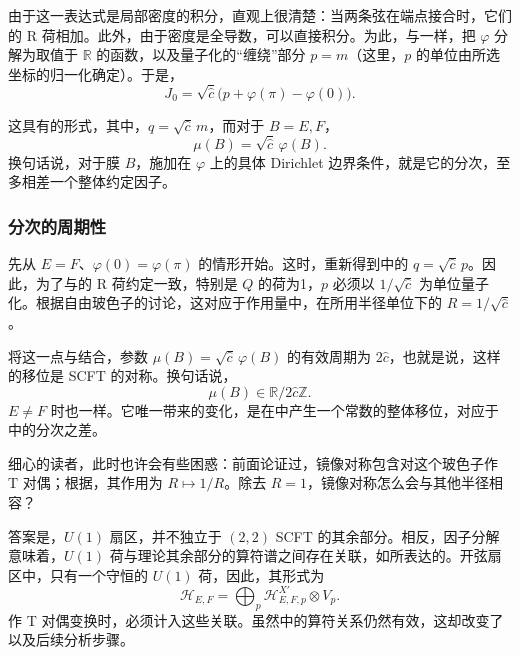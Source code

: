 由于这一表达式是局部密度的积分，直观上很清楚：当两条弦在端点接合时，它们的 R 荷相加。此外，由于密度是全导数，可以直接积分。为此，与一样，把 $\varphi$ 分解为取值于 $\mathbb{R}$ 的函数，以及量子化的“缠绕”部分 $p=m$（这里，$p$ 的单位由所选坐标的归一化确定）。于是，
\begin{equation}\label{eq:5.59}
J_0=\sqrt{\hat c}\bigl(p+\varphi(\pi)-\varphi(0)\bigr).
\end{equation}

这具有的形式，其中，$q=\sqrt{\hat c}\,m$，而对于 $B=E,F$，
\begin{equation}\label{eq:5.60}
\mu(B)=\sqrt{\hat c}\,\varphi(B).
\end{equation}
换句话说，对于膜 $B$，施加在 $\varphi$ 上的具体 Dirichlet 边界条件，就是它的分次，至多相差一个整体约定因子。

\subsubsection{分次的周期性}\label{sec:5.3.4.1}

先从 $E=F$、$\varphi(0)=\varphi(\pi)$ 的情形开始。这时，重新得到中的 $q=\sqrt{\hat c}\,p$。因此，为了与的 R 荷约定一致，特别是 $Q$ 的荷为1，$p$ 必须以 $1/\sqrt{\hat c}$ 为单位量子化。根据自由玻色子的讨论，这对应于作用量中，在所用半径单位下的 $R=1/\sqrt{\hat c}$。

将这一点与结合，参数 $\mu(B)=\sqrt{\hat c}\,\varphi(B)$ 的有效周期为 $2\hat c$，也就是说，这样的移位是 SCFT 的对称。换句话说，
\begin{equation}\label{eq:5.61}
\mu(B)\in\mathbb{R}/2\hat c\mathbb{Z}.
\end{equation}
$E\ne F$ 时也一样。它唯一带来的变化，是在中产生一个常数的整体移位，对应于中的分次之差。

细心的读者，此时也许会有些困惑：前面论证过，镜像对称包含对这个玻色子作 T 对偶；根据，其作用为 $R\mapsto1/R$。除去 $R=1$，镜像对称怎么会与其他半径相容？

答案是，$U(1)$ 扇区，并不独立于 $(2,2)$ SCFT 的其余部分。相反，因子分解意味着，$U(1)$ 荷与理论其余部分的算符谱之间存在关联，如所表达的。开弦扇区中，只有一个守恒的 $U(1)$ 荷，因此，其形式为
\begin{equation}\label{eq:5.62}
\mathcal{H}_{E,F}=\bigoplus_p\mathcal{H}^{X'}_{E,F,p}\otimes V_p.
\end{equation}
作 T 对偶变换时，必须计入这些关联。虽然中的算符关系仍然有效，这却改变了以及后续分析步骤。

